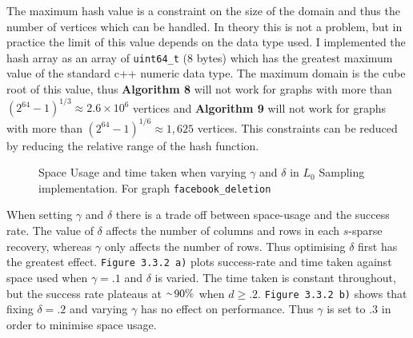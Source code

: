 \documentclass[11pt,twoside,a4paper]{report}
\begin{document}
\par The maximum hash value is a constraint on the size of the domain and thus the number of vertices which can be handled. In theory this is not a problem, but in practice the limit of this value depends on the data type used. I implemented the hash array as an array of \texttt{uint64\_t} (8 bytes) which has the greatest maximum value of the standard c++ numeric data type. The maximum domain is the cube root of this value, thus \textbf{Algorithm 8} will not work for graphs with more than $(2^{64}-1)^{1/3}\approx2.6\times10^6$ vertices and \textbf{Algorithm 9} will not work for graphs with more than $(2^{64}-1)^{1/6}\approx1,625$ vertices. This constraints can be reduced by reducing the relative range of the hash function.

\begin{figure}[H]
	\label{Figure 14}
	\caption{Space Usage and time taken when varying $\gamma$ and $\delta$ in $L_0$ Sampling implementation. For graph \texttt{facebook\_deletion}}
\end{figure}

\par When setting $\gamma$ and $\delta$ there is a trade off between space-usage and the success rate. The value of $\delta$ affects the number of columns and rows in each $s$-sparse recovery, whereas $\gamma$ only affects the number of rows. Thus optimising $\delta$ first has the greatest effect. \texttt{Figure 3.3.2 a)} plots success-rate and time taken against space used when $\gamma=.1$ and $\delta$ is varied. The time taken is constant throughout, but the success rate plateaus at $\smallsim\!90\%$ when $d\geq.2$. \texttt{Figure 3.3.2 b)} shows that fixing $\delta=.2$ and varying $\gamma$ has no effect on performance. Thus $\gamma$ is set to .3 in order to minimise space usage.
\end{document}
